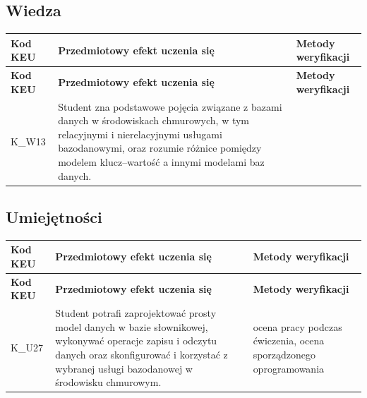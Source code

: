 \documentclass[12pt, a4paper]{article}
\newcommand{\thdrule}{\noalign{\global\setlength{\extrarowheight}{0pt}}}
\newcommand{\thdend}{\noalign{\global\setlength{\extrarowheight}{3pt}}}
\begin{document}
\subsection*{Wiedza}
{\scriptsize
\begin{longtable}{m{1.6cm}m{9.0cm}m{4.2cm}}
\thdrule\toprule
\rowcolor{pjatkRed} {\color{white}\footnotesize\textbf{\vphantom{Ag}Kod KEU}} & {\color{white}\footnotesize\textbf{\vphantom{Ag}Przedmiotowy efekt uczenia się}} & {\color{white}\footnotesize\textbf{\vphantom{Ag}Metody weryfikacji}} \\
\midrule\thdend
\endfirsthead
\thdrule\toprule
\rowcolor{pjatkRed} {\color{white}\footnotesize\textbf{\vphantom{Ag}Kod KEU}} & {\color{white}\footnotesize\textbf{\vphantom{Ag}Przedmiotowy efekt uczenia się}} & {\color{white}\footnotesize\textbf{\vphantom{Ag}Metody weryfikacji}} \\
\midrule\thdend
\endhead
  \rowcolor{tableRowLight} K\_W13 & Student zna podstawowe pojęcia związane z bazami danych w środowiskach chmurowych, w tym relacyjnymi i nierelacyjnymi usługami bazodanowymi, oraz rozumie różnice pomiędzy modelem klucz–wartość a innymi modelami baz danych. &  \\
\bottomrule
\end{longtable}}

\subsection*{Umiejętności}
{\scriptsize
\begin{longtable}{m{1.6cm}m{9.0cm}m{4.2cm}}
\thdrule\toprule
\rowcolor{pjatkRed} {\color{white}\footnotesize\textbf{\vphantom{Ag}Kod KEU}} & {\color{white}\footnotesize\textbf{\vphantom{Ag}Przedmiotowy efekt uczenia się}} & {\color{white}\footnotesize\textbf{\vphantom{Ag}Metody weryfikacji}} \\
\midrule\thdend
\endfirsthead
\thdrule\toprule
\rowcolor{pjatkRed} {\color{white}\footnotesize\textbf{\vphantom{Ag}Kod KEU}} & {\color{white}\footnotesize\textbf{\vphantom{Ag}Przedmiotowy efekt uczenia się}} & {\color{white}\footnotesize\textbf{\vphantom{Ag}Metody weryfikacji}} \\
\midrule\thdend
\endhead
  \rowcolor{tableRowLight} K\_U27 & Student potrafi zaprojektować prosty model danych w bazie słownikowej, wykonywać operacje zapisu i odczytu danych oraz skonfigurować i korzystać z wybranej usługi bazodanowej w środowisku chmurowym. & ocena pracy podczas ćwiczenia, ocena sporządzonego oprogramowania \\
\bottomrule
\end{longtable}}
\end{document}
